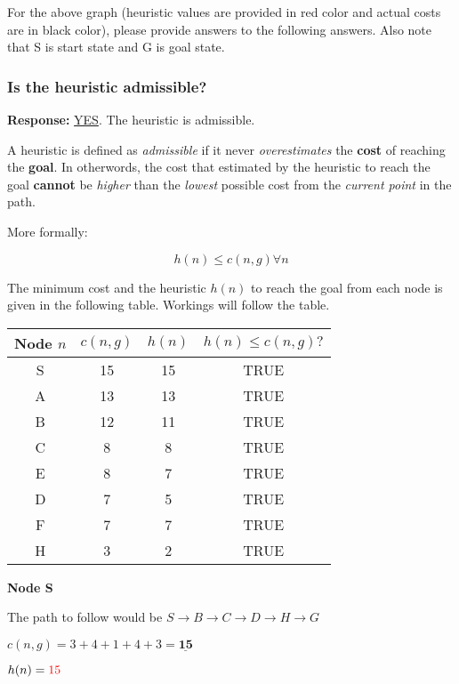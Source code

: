 \documentclass[12pt, letterpaper]{article}
\newcommand{\mybox}[1]{\par\noindent\colorbox{shadecolor}
{\parbox{\dimexpr\textwidth-2\fboxsep\relax}{#1}}}
\begin{document}
\mybox{For the above graph (heuristic values are provided in red color and actual costs are in black
color), please provide answers to the following answers. Also note that S is start state and G
is goal state.}

\subsubsection{Is the heuristic admissible?}

\textbf{Response:} \underline{YES}. The heuristic is admissible.

A heuristic is defined as \textit{admissible} if it never \textit{overestimates} the \textbf{cost} of reaching the \textbf{goal}. 
In otherwords, the cost that estimated by the heuristic to reach the goal \textbf{cannot} be \textit{higher} than the \textit{lowest} possible cost from the \textit{current point} in the path.

More formally: 

\[h(n)\leq c(n,g) \forall n\]

The minimum cost and the heuristic $h(n)$ to reach the goal from each node is given in the following table.
Workings will follow the table.

\begin{center}
    \begin{tabular}{|c|c|c|c|} 
    \hline
    Node $n$ & $c(n,g)$ & $h(n)$ & $h(n)\leq c(n,g)?$ \\ 
    \hline
    S & 15 & 15 & TRUE\\
    \hline
    A & 13 & 13 & TRUE\\
    \hline
    B & 12 & 11 & TRUE\\
    \hline
    C & 8 & 8 & TRUE\\
    \hline
    E & 8 & 7 & TRUE\\
    \hline
    D & 7 & 5 & TRUE\\
    \hline
    F & 7 & 7 & TRUE\\
    \hline
    H & 3 & 2 & TRUE\\
    \hline
    \end{tabular}
\end{center}

\textbf{Node S}

The path to follow would be $S\rightarrow B\rightarrow C\rightarrow D\rightarrow H\rightarrow G$

$c(n,g)=3+4+1+4+3=\underline{\textbf{15}}$

$h(n)=\textcolor{red}{15}$
\end{document}
